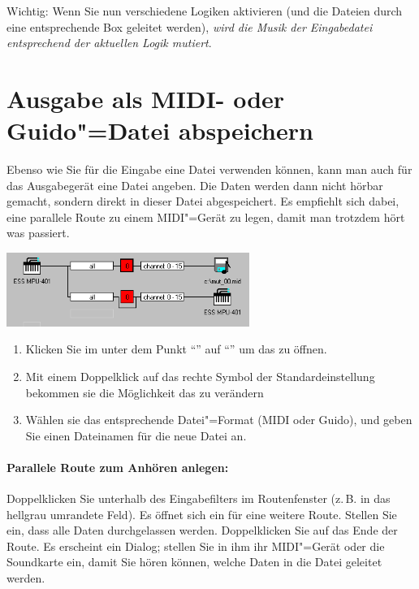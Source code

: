 Wichtig: Wenn Sie nun verschiedene Logiken aktivieren (und 
die Dateien durch eine entsprechende Box geleitet werden), \emph{wird 
die Musik der Eingabedatei entsprechend der aktuellen Logik mutiert}.



\section{Ausgabe als MIDI- oder Guido"=Datei abspeichern}\label{sec:CC_MIDIOUT}




Ebenso wie Sie für die Eingabe eine Datei verwenden können, 
kann man auch für das Ausgabegerät eine Datei angeben. Die 
Daten werden dann nicht hörbar gemacht, sondern direkt in dieser 
Datei abgespeichert. Es empfiehlt sich dabei, eine parallele 
Route zu einem MIDI"=Gerät zu legen, damit man trotzdem hört 
was passiert.


\begin{center}
\ifhtml
{}
\else
\includegraphics[width=224.5pt]{cc_midiout}
\fi
\end{center}

\begin{enumerate}
\item Klicken Sie im  unter dem Punkt
  "`"' auf
  "`"' um das
   zu öffnen.
\item Mit einem Doppelklick auf das rechte Symbol der
  Standardeinstellung bekommen sie die Möglichkeit das
   zu verändern
\item Wählen sie das entsprechende Datei"=Format (MIDI oder Guido),
  und geben Sie einen Dateinamen für die neue Datei an.
\end{enumerate}


\paragraph{Parallele Route zum Anhören anlegen:} Doppelklicken Sie 
unterhalb des Eingabefilters im Routenfenster (z.\,B. in das hellgrau 
umrandete Feld). Es öffnet sich ein  
für eine weitere Route. Stellen Sie ein, dass alle Daten durchgelassen 
werden. Doppelklicken Sie auf das Ende der Route. Es erscheint 
ein  Dialog; stellen Sie in ihm 
ihr MIDI"=Gerät oder die Soundkarte ein, damit Sie hören können, 
welche Daten in die Datei geleitet werden.

